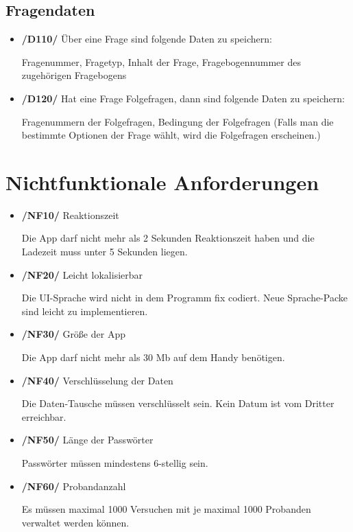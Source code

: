 \documentclass[a4paper]{scrreprt}
\begin{document}
        \section{Fragendaten}
            \begin{itemize}
                \item \textbf{/D110/} Über eine Frage sind folgende Daten zu speichern:
                    \par Fragenummer, Fragetyp, Inhalt der Frage, Fragebogennummer des zugehörigen Fragebogens

                \item \textbf{/D120/} Hat eine Frage Folgefragen, dann sind folgende Daten zu speichern:
                    \par Fragenummern der Folgefragen, Bedingung der Folgefragen (Falls man die bestimmte Optionen der Frage wählt, wird die Folgefragen erscheinen.)
            \end{itemize}

    \chapter{Nichtfunktionale Anforderungen}
        \begin{itemize}
            \item \textbf{/NF10/} Reaktionszeit
                \par Die App darf nicht mehr als 2 Sekunden Reaktionszeit haben und die Ladezeit muss unter 5 Sekunden liegen.

            \item \textbf{/NF20/} Leicht lokalisierbar
                \par Die UI-Sprache wird nicht in dem Programm fix codiert. Neue Sprache-Packe sind leicht zu implementieren.

            \item \textbf{/NF30/} Größe der App
                \par Die App darf nicht mehr als 30 Mb auf dem Handy benötigen.

            \item \textbf{/NF40/} Verschlüsselung der Daten
                \par Die Daten-Tausche müssen verschlüsselt sein. Kein Datum ist vom Dritter erreichbar.

            \item \textbf{/NF50/} Länge der Passwörter
                \par Passwörter müssen mindestens 6-stellig sein.

            \item \textbf{/NF60/} Probandanzahl
            \par Es müssen maximal 1000 Versuchen mit je maximal 1000 Probanden verwaltet werden können.
        \end{itemize}
\end{document}
